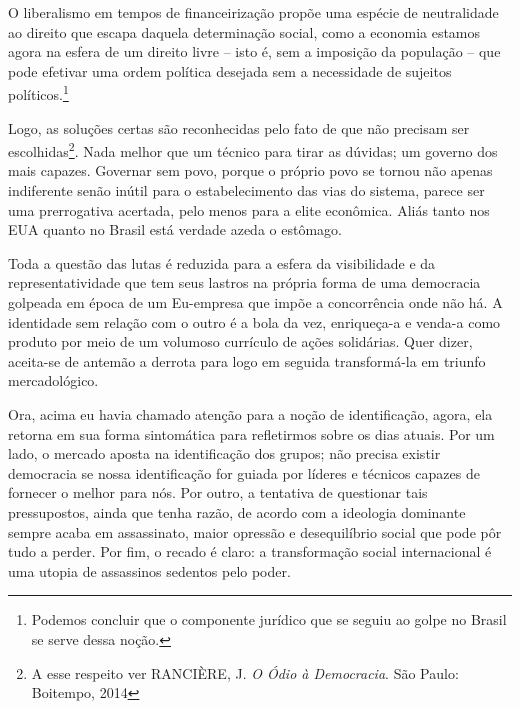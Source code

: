 O liberalismo em tempos de financeirização propõe uma espécie de
neutralidade ao direito que escapa daquela determinação social, como a
economia estamos agora na esfera de um direito livre -- isto é, sem a
imposição da população -- que pode efetivar uma ordem política desejada
sem a necessidade de sujeitos políticos.\footnote{Podemos concluir que o
  componente jurídico que se seguiu ao golpe no Brasil se serve dessa
  noção.}

Logo, as soluções certas são reconhecidas pelo fato de que não precisam
ser escolhidas\footnote{A esse respeito ver RANCIÈRE, J. \emph{O Ódio à
  Democracia}. São Paulo: Boitempo, 2014}. Nada melhor que um técnico
para tirar as dúvidas; um governo dos mais capazes. Governar sem povo,
porque o próprio povo se tornou não apenas indiferente senão inútil para
o estabelecimento das vias do sistema, parece ser uma prerrogativa
acertada, pelo menos para a elite econômica. Aliás tanto nos EUA quanto
no Brasil está verdade azeda o estômago.

Toda a questão das lutas é reduzida para a esfera da visibilidade e da
representatividade que tem seus lastros na própria forma de uma
democracia golpeada em época de um Eu-empresa que impõe a concorrência
onde não há. A identidade sem relação com o outro é a bola da vez,
enriqueça-a e venda-a como produto por meio de um volumoso currículo de
ações solidárias. Quer dizer, aceita-se de antemão a derrota para logo
em seguida transformá-la em triunfo mercadológico.

Ora, acima eu havia chamado atenção para a noção de identificação,
agora, ela retorna em sua forma sintomática para refletirmos sobre os
dias atuais. Por um lado, o mercado aposta na identificação dos grupos;
não precisa existir democracia se nossa identificação for guiada por
líderes e técnicos capazes de fornecer o melhor para nós. Por outro, a
tentativa de questionar tais pressupostos, ainda que tenha razão, de
acordo com a ideologia dominante sempre acaba em assassinato, maior
opressão e desequilíbrio social que pode pôr tudo a perder. Por fim, o
recado é claro: a transformação social internacional é uma utopia de
assassinos sedentos pelo poder.

